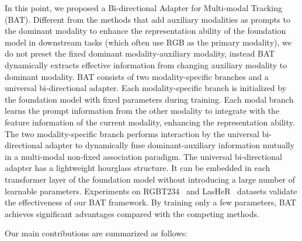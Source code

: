 \documentclass[letterpaper]{article} %
\begin{document}
In this point, we proposed a Bi-directional Adapter for Multi-modal Tracking (BAT). Different from the methods that add auxiliary modalities as prompts to the dominant modality to enhance the representation ability of the foundation model in downstream tasks (which often use RGB as the primary modality), we do not preset the fixed dominant modality-auxiliary modality, instead BAT dynamically extracts effective information from changing auxiliary modality to dominant modality.
BAT consists of two modality-specific branches and a universal bi-directional adapter. Each modality-specific branch is initialized by the foundation model with fixed parameters during training.
Each modal branch learns the prompt information from the other modality to integrate with the feature information of the current modality, enhancing the representation ability.
The two modality-specific branch performs interaction by the universal bi-directional adapter to dynamically fuse dominant-auxiliary information mutually in a multi-modal non-fixed association paradigm.
The universal bi-directional adapter has a lightweight hourglass structure. It can be embedded in each transformer layer of the foundation model without introducing a large number of learnable parameters. Experiments on RGBT234~\cite{rgbt234} and LasHeR~\cite{LasHeR} datasets validate the effectiveness of our BAT framework. By training only a few parameters, BAT achieves significant advantages compared with the competing methods.

Our main contributions are summarized as follows:
\end{document}
